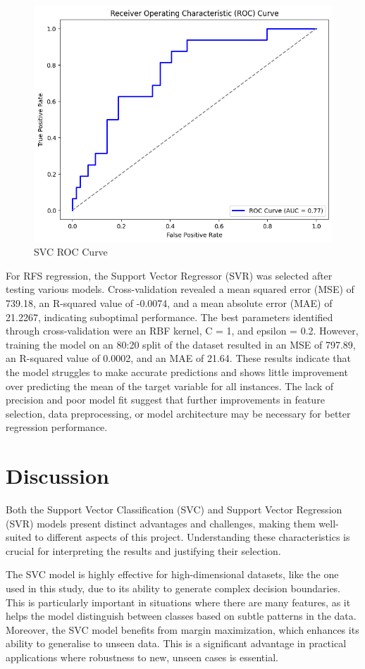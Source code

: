 \documentclass{article}
\begin{document}
\begin{figure}
  \centering
  \includegraphics[width=0.75\linewidth]{roc.png}
  \caption{SVC ROC Curve}
  \label{fig:f2}
\end{figure}

For RFS regression, the Support Vector Regressor (SVR) was selected after testing various models. Cross-validation revealed a mean squared error (MSE) of 739.18, an R-squared value of -0.0074, and a mean absolute error (MAE) of 21.2267, indicating suboptimal performance. The best parameters identified through cross-validation were an RBF kernel, C = 1, and epsilon = 0.2. However, training the model on an 80:20 split of the dataset resulted in an MSE of 797.89, an R-squared value of 0.0002, and an MAE of 21.64. These results indicate that the model struggles to make accurate predictions and shows little improvement over predicting the mean of the target variable for all instances. The lack of precision and poor model fit suggest that further improvements in feature selection, data preprocessing, or model architecture may be necessary for better regression performance.

\section{Discussion}

Both the Support Vector Classification (SVC) and Support Vector Regression (SVR) models present distinct advantages and challenges, making them well-suited to different aspects of this project. Understanding these characteristics is crucial for interpreting the results and justifying their selection.

The SVC model is highly effective for high-dimensional datasets, like the one used in this study, due to its ability to generate complex decision boundaries. This is particularly important in situations where there are many features, as it helps the model distinguish between classes based on subtle patterns in the data. Moreover, the SVC model benefits from margin maximization, which enhances its ability to generalise to unseen data. This is a significant advantage in practical applications where robustness to new, unseen cases is essential.
\end{document}
